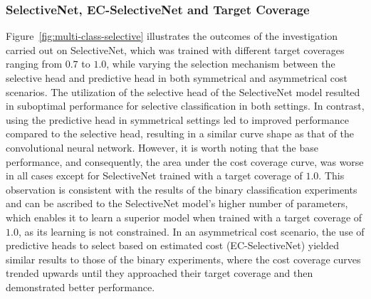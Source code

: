 \subsubsection{SelectiveNet, EC-SelectiveNet and Target Coverage}
Figure~\ref{fig:multi-class-selective} illustrates the outcomes of the investigation carried out on SelectiveNet, which was trained with different target coverages ranging from $0.7$ to $1.0$, while varying the selection mechanism between the selective head and predictive head in both symmetrical and asymmetrical cost scenarios. The utilization of the selective head of the SelectiveNet model resulted in suboptimal performance for selective classification in both settings. In contrast, using the predictive head in symmetrical settings led to improved performance compared to the selective head, resulting in a similar curve shape as that of the convolutional neural network. However, it is worth noting that the base performance, and consequently, the area under the cost coverage curve, was worse in all cases except for SelectiveNet trained with a target coverage of $1.0$. This observation is consistent with the results of the binary classification experiments and can be ascribed to the SelectiveNet model's higher number of parameters, which enables it to learn a superior model when trained with a target coverage of $1.0$, as its learning is not constrained. In an asymmetrical cost scenario, the use of predictive heads to select based on estimated cost (EC-SelectiveNet) yielded similar results to those of the binary experiments, where the cost coverage curves trended upwards until they approached their target coverage and then demonstrated better performance.


